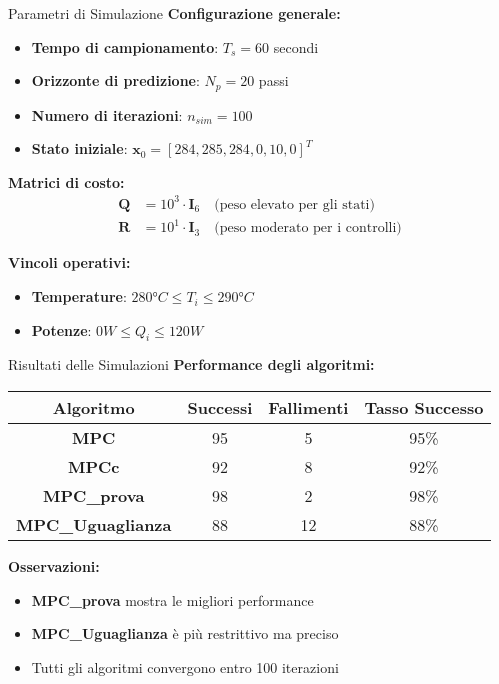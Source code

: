 \documentclass[beamer]{beamer}
\begin{document}
\begin{frame}{Parametri di Simulazione}
    \textbf{Configurazione generale:}
    \begin{itemize}
        \item \textbf{Tempo di campionamento}: $T_s = 60$ secondi
        \item \textbf{Orizzonte di predizione}: $N_p = 20$ passi
        \item \textbf{Numero di iterazioni}: $n_{sim} = 100$
        \item \textbf{Stato iniziale}: $\mathbf{x}_0 = [284, 285, 284, 0, 10, 0]^T$
    \end{itemize}
    
    \textbf{Matrici di costo:}
    \begin{align}
        \mathbf{Q} &= 10^3 \cdot \mathbf{I}_6 \quad \text{(peso elevato per gli stati)} \\
        \mathbf{R} &= 10^1 \cdot \mathbf{I}_3 \quad \text{(peso moderato per i controlli)}
    \end{align}
    
    \textbf{Vincoli operativi:}
    \begin{itemize}
        \item \textbf{Temperature}: $280°C \leq T_i \leq 290°C$
        \item \textbf{Potenze}: $0W \leq Q_i \leq 120W$
    \end{itemize}
\end{frame}

\begin{frame}{Risultati delle Simulazioni}
    \textbf{Performance degli algoritmi:}
    \begin{center}
        \begin{tabular}{|c|c|c|c|}
            \hline
            \textbf{Algoritmo} & \textbf{Successi} & \textbf{Fallimenti} & \textbf{Tasso Successo} \\
            \hline
            \textbf{MPC} & 95 & 5 & 95\% \\
            \hline
            \textbf{MPCc} & 92 & 8 & 92\% \\
            \hline
            \textbf{MPC\_prova} & 98 & 2 & 98\% \\
            \hline
            \textbf{MPC\_Uguaglianza} & 88 & 12 & 88\% \\
            \hline
        \end{tabular}
    \end{center}
    
    \textbf{Osservazioni:}
    \begin{itemize}
        \item \textbf{MPC\_prova} mostra le migliori performance
        \item \textbf{MPC\_Uguaglianza} è più restrittivo ma preciso
        \item Tutti gli algoritmi convergono entro 100 iterazioni
    \end{itemize}
\end{frame}
\end{document}
